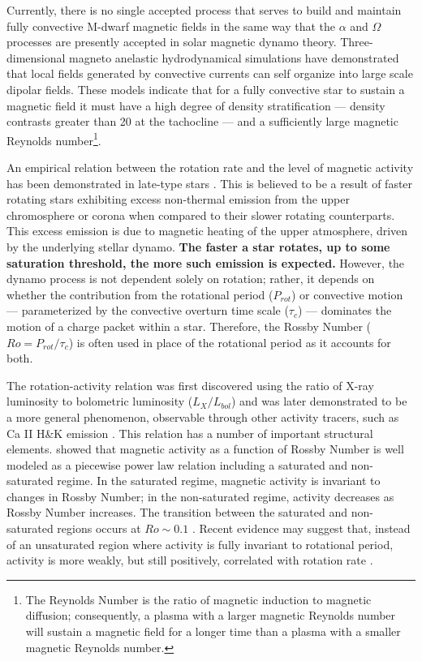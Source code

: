 Currently, there is no single accepted process that serves to build and
maintain fully convective M-dwarf magnetic fields in the same way that the
$\alpha$ and $\Omega$ processes are presently accepted in solar magnetic dynamo
theory. Three-dimensional magneto anelastic hydrodynamical simulations have
demonstrated that local fields generated by convective currents can self
organize into large scale dipolar fields. 
These models indicate that for a fully convective star to sustain a magnetic
field it must have a high degree of density stratification --- density
contrasts greater than 20 at the tachocline --- and a sufficiently large magnetic Reynolds
number\footnote{The Reynolds Number is the ratio of magnetic induction to
magnetic diffusion; consequently, a plasma with a larger magnetic Reynolds
number will  sustain a magnetic field for a longer time than a plasma with a
smaller magnetic Reynolds number.}.

An empirical relation between the rotation rate and the level of magnetic
activity has been demonstrated in late-type stars \textbf{\citep{Skumanich1972, Pal81}}. This is
believed to be a result of faster rotating stars exhibiting excess non-thermal
emission from the upper chromosphere or corona when compared to their slower
rotating counterparts. This excess emission is due to magnetic heating of the
upper atmosphere, driven by the underlying stellar dynamo.
\textbf{The faster a star rotates, up to some saturation threshold, the more such emission is expected.} However,
the dynamo process is not dependent solely on rotation; rather, it depends on
whether the contribution from the rotational period ($P_{rot}$) or convective
motion --- parameterized by the convective overturn time scale ($\tau_{c}$) ---
dominates the motion of a charge packet within a star. Therefore, the Rossby
Number ($Ro = P_{rot}/\tau_{c}$) is often used in place of the rotational
period as it accounts for both.

The rotation-activity relation was first discovered using the ratio of X-ray
luminosity to bolometric luminosity ($L_{X}/L_{bol}$) \citep{Pal81} and was
later demonstrated to be a more general phenomenon, observable through other
activity tracers, such as Ca II H\&K emission \textbf{\citep{Vilhu1984}}. This relation has
a number of important structural elements. \citet{Noy84} showed that magnetic
activity as a function of Rossby Number is well modeled as a piecewise power
law relation including a saturated and non-saturated regime. In the saturated
regime, magnetic activity is invariant to changes in Rossby Number; in the
non-saturated regime, activity decreases as Rossby Number increases. The
transition between the saturated and non-saturated regions occurs at $Ro \sim
0.1$ \citep[e.g.][]{Wri11}. Recent evidence may suggest that, instead of an
unsaturated region where activity is fully invariant to rotational period,
activity is more weakly, but still positively, correlated with rotation rate
\citep{Mamajek2008, Reiners2014, Leh20, Magaudda2020}. 

